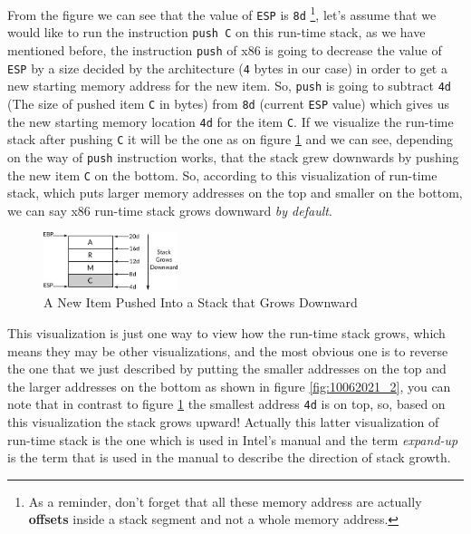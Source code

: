 From the figure we can see that the value of \lstinline!ESP! is
\lstinline!8d! \footnote{As a reminder, don't forget that all these
  memory address are actually \textbf{offsets} inside a stack segment
  and not a whole memory address.}, let's assume that we would like to
run the instruction \lstinline!push C! on this run-time stack, as we
have mentioned before, the instruction \lstinline!push! of x86 is going
to decrease the value of \lstinline!ESP! by a size decided by the
architecture (\lstinline!4! bytes in our case) in order to get a new
starting memory address for the new item. So, \lstinline!push! is going
to subtract \lstinline!4d! (The size of pushed item \lstinline!C! in
bytes) from \lstinline!8d! (current \lstinline!ESP! value) which gives
us the new starting memory location \lstinline!4d! for the item
\lstinline!C!. If we visualize the run-time stack after pushing
\lstinline!C! it will be the one as on figure \ref{fig:10062021_1} and
we can see, depending on the way of \lstinline!push! instruction works,
that the stack grew downwards by pushing the new item \lstinline!C! on
the bottom. So, according to this visualization of run-time stack, which
puts larger memory addresses on the top and smaller on the bottom, we
can say x86 run-time stack grows downward \emph{by default}.

\begin{figure}
\centering
\includegraphics[width=0.35000\textwidth]{Figures/x86-ch/Fig10062021_1.png}
\caption{A New Item Pushed Into a Stack that Grows
Downward}\label{fig:10062021_1}
\end{figure}

This visualization is just one way to view how the run-time stack grows,
which means they may be other visualizations, and the most obvious one
is to reverse the one that we just described by putting the smaller
addresses on the top and the larger addresses on the bottom as shown in
figure \ref{fig:10062021_2}, you can note that in contrast to figure
\ref{fig:10062021_1} the smallest address \lstinline!4d! is on top, so,
based on this visualization the stack grows upward! Actually this latter
visualization of run-time stack is the one which is used in Intel's
manual and the term \emph{expand-up} is the term that is used in the
manual to describe the direction of stack growth.

